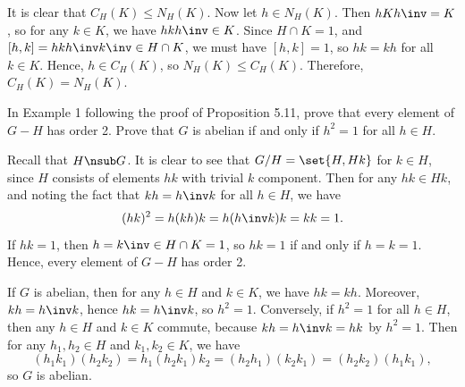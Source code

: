 \begin{sol}
    It is clear that $C_H(K) \leq N_H(K)$. Now let $h \in N_H(K)$. Then $hKh\inv = K$, so for any $k \in K$, we have $hkh\inv \in K$. Since $H \cap K = 1$, and $[h, k] = hkh\inv k\inv \in H \cap K$, we must have $[h, k] = 1$, so $hk = kh$ for all $k \in K$. Hence, $h \in C_H(K)$, so $N_H(K) \leq C_H(K)$. Therefore, $C_H(K) = N_H(K)$.
\end{sol}

\begin{exercise}\label{ex5.5.3}
    In Example 1 following the proof of Proposition 5.11, prove that every element of $G - H$ has order 2. Prove that $G$ is abelian if and only if $h^2 = 1$ for all $h \in H$.
\end{exercise}

\begin{sol}
    Recall that $H \nsub G$. It is clear to see that $G/H = \set{H, Hk}$ for $k \in H$, since $H$ consists of elements $hk$ with trivial $k$ component. Then for any $hk \in Hk$, and noting the fact that $kh = h\inv k$ for all $h \in H$, we have
    \[(hk)^2 = h(kh)k = h(h\inv k)k = kk = 1.\]
    If $hk = 1$, then $h = k\inv \in H \cap K = 1$, so $hk = 1$ if and only if $h = k = 1$. Hence, every element of $G - H$ has order 2.
    
    If $G$ is abelian, then for any $h \in H$ and $k \in K$, we have $hk = kh$. Moreover, $kh = h\inv k$, hence $hk = h\inv k$, so $h^2 = 1$. Conversely, if $h^2 = 1$ for all $h \in H$, then any $h \in H$ and $k \in K$ commute, because $kh = h\inv k = hk$ by $h^2 = 1$. Then for any $h_1, h_2 \in H$ and $k_1, k_2 \in K$, we have
    \[(h_1k_1)(h_2k_2) = h_1(h_2k_1)k_2 = (h_2h_1)(k_2k_1) = (h_2k_2)(h_1k_1),\]
    so $G$ is abelian.
\end{sol}